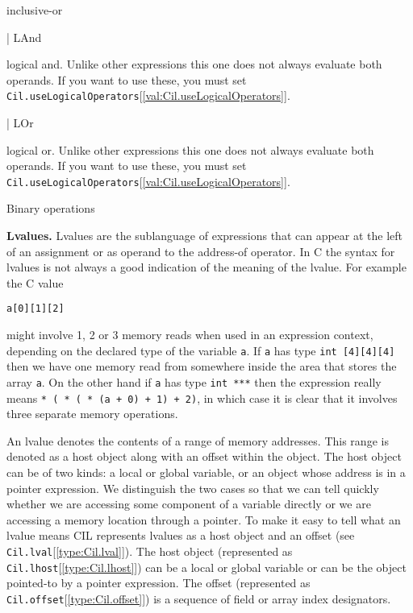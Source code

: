 \documentclass[11pt]{article}
\begin{document}
\begin{ocamldoccomment}
inclusive-or
\end{ocamldoccomment}
\begin{ocamldoccode}
  | LAnd
\end{ocamldoccode}
\begin{ocamldoccomment}
logical and. Unlike other 
 expressions this one does not 
 always evaluate both operands. If 
 you want to use these, you must 
 set {\tt{Cil.useLogicalOperators}}[\ref{val:Cil.useLogicalOperators}].
\end{ocamldoccomment}
\begin{ocamldoccode}
  | LOr
\end{ocamldoccode}
\begin{ocamldoccomment}
logical or. Unlike other 
 expressions this one does not 
 always evaluate both operands.  If 
 you want to use these, you must 
 set {\tt{Cil.useLogicalOperators}}[\ref{val:Cil.useLogicalOperators}].
\end{ocamldoccomment}
\begin{ocamldocdescription}
Binary operations


\end{ocamldocdescription}




{\bf Lvalues.} Lvalues are the sublanguage of expressions that can appear at the left of an assignment or as operand to the address-of operator. 
In C the syntax for lvalues is not always a good indication of the meaning 
of the lvalue. For example the C value
\begin{verbatim} 
a[0][1][2]
\end{verbatim}
 might involve 1, 2 or 3 memory reads when used in an expression context,
depending on the declared type of the variable {\tt{a}}. If {\tt{a}} has type {\tt{int\
[4][4][4]}} then we have one memory read from somewhere inside the area 
that stores the array {\tt{a}}. On the other hand if {\tt{a}} has type {\tt{int ***}} then
the expression really means {\tt{* ( * ( * (a + 0) + 1) + 2)}}, in which case it is
clear that it involves three separate memory operations. 


An lvalue denotes the contents of a range of memory addresses. This range 
is denoted as a host object along with an offset within the object. The 
host object can be of two kinds: a local or global variable, or an object 
whose address is in a pointer expression. We distinguish the two cases so 
that we can tell quickly whether we are accessing some component of a 
variable directly or we are accessing a memory location through a pointer.
To make it easy to 
tell what an lvalue means CIL represents lvalues as a host object and an
offset (see {\tt{Cil.lval}}[\ref{type:Cil.lval}]). The host object (represented as
{\tt{Cil.lhost}}[\ref{type:Cil.lhost}]) can be a local or global variable or can be the object
pointed-to by a pointer expression. The offset (represented as
{\tt{Cil.offset}}[\ref{type:Cil.offset}]) is a sequence of field or array index designators.
\end{document}
